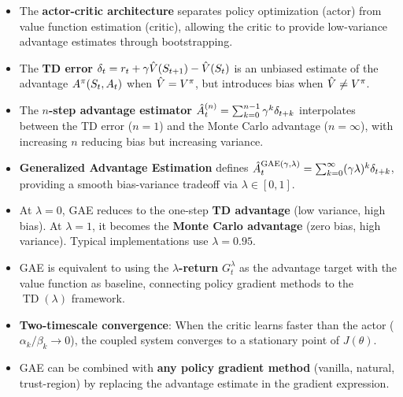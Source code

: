 \documentclass[11pt,a4paper]{article}
\begin{document}
\begin{itemize}
  \item The \textbf{actor-critic architecture} separates policy
    optimization (actor) from value function estimation (critic),
    allowing the critic to provide low-variance advantage estimates
    through bootstrapping.

  \item The \textbf{TD error} $\delta_t = r_t + \gamma \hat{V}(S_{t+1})
    - \hat{V}(S_t)$ is an unbiased estimate of the advantage
    $A^\pi(S_t, A_t)$ when $\hat{V} = V^{\pi}$, but introduces bias
    when $\hat{V} \neq V^{\pi}$.

  \item The \textbf{$n$-step advantage estimator} $\hat{A}_t^{(n)} =
    \sum_{k=0}^{n-1} \gamma^k \delta_{t+k}$ interpolates between
    the TD error ($n=1$) and the Monte Carlo advantage ($n=\infty$),
    with increasing $n$ reducing bias but increasing variance.

  \item \textbf{Generalized Advantage Estimation} defines
    $\hat{A}_t^{\mathrm{GAE}(\gamma,\lambda)} = \sum_{k=0}^\infty
    (\gamma\lambda)^k \delta_{t+k}$, providing a smooth
    bias-variance tradeoff via $\lambda \in [0,1]$.

  \item At $\lambda = 0$, GAE reduces to the one-step \textbf{TD
    advantage} (low variance, high bias). At $\lambda = 1$, it becomes
    the \textbf{Monte Carlo advantage} (zero bias, high variance).
    Typical implementations use $\lambda = 0.95$.

  \item GAE is equivalent to using the \textbf{$\lambda$-return}
    $G_t^\lambda$ as the advantage target with the value function as
    baseline, connecting policy gradient methods to the
    $\operatorname{TD}(\lambda)$ framework.

  \item \textbf{Two-timescale convergence}: When the critic learns
    faster than the actor ($\alpha_k / \beta_k \to 0$), the coupled
    system converges to a stationary point of $J(\theta)$.

  \item GAE can be combined with \textbf{any policy gradient method}
    (vanilla, natural, trust-region) by replacing the advantage
    estimate in the gradient expression.
\end{itemize}

\end{document}
